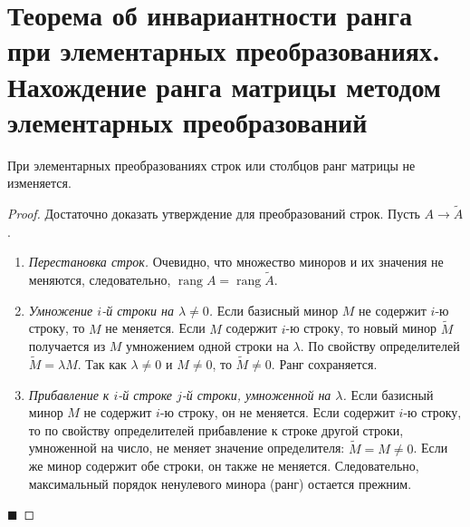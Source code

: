 \section{Теорема об инвариантности ранга при элементарных преобразованиях. Нахождение ранга матрицы методом элементарных преобразований}

\begin{theorem}
При элементарных преобразованиях строк или столбцов ранг матрицы не изменяется.
\end{theorem}

\begin{proof}
Достаточно доказать утверждение для преобразований строк. Пусть $A \to \tilde{A}$.
\begin{enumerate}
    \item \textit{Перестановка строк.} Очевидно, что множество миноров и их значения не меняются, следовательно, $\operatorname{rang} A = \operatorname{rang} \tilde{A}$.
    \item \textit{Умножение $i$-й строки на $\lambda \neq 0$.} 
    Если базисный минор $M$ не содержит $i$-ю строку, то $M$ не меняется. Если $M$ содержит $i$-ю строку, то новый минор $\tilde{M}$ получается из $M$ умножением одной строки на $\lambda$. По свойству определителей $\tilde{M} = \lambda M$. Так как $\lambda \neq 0$ и $M \neq 0$, то $\tilde{M} \neq 0$. Ранг сохраняется.
    \item \textit{Прибавление к $i$-й строке $j$-й строки, умноженной на $\lambda$.} 
    Если базисный минор $M$ не содержит $i$-ю строку, он не меняется. Если содержит $i$-ю строку, то по свойству определителей прибавление к строке другой строки, умноженной на число, не меняет значение определителя: $\tilde{M} = M \neq 0$. Если же минор содержит обе строки, он также не меняется. Следовательно, максимальный порядок ненулевого минора (ранг) остается прежним.
\end{enumerate}
\hfill$\blacksquare$
\end{proof}

